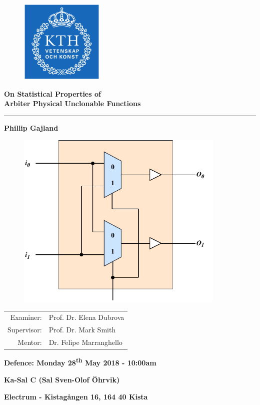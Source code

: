 \documentclass{article}
\begin{document}
\begin{figure}
    \begin{flushright}
    \includegraphics[width = 40mm]{kth_logo.png}
    \end{flushright}
\end{figure}

\vspace{10cm}

\Huge\textbf{On Statistical Properties of\\[0.25cm]
Arbiter Physical Unclonable Functions}
\\\rule{17cm}{0.5pt}

\vspace{0.5cm}

\textbf{Phillip Gajland}

\vspace{2.5cm}

\begin{figure}
    \begin{flushright}
    \includegraphics[width = 100mm]{switch_block_detailed.pdf}
    \end{flushright}
\end{figure}

\Large
\begin{tabular}{ r l }
Examiner: & Prof. Dr. Elena Dubrova\\
Supervisor: & Prof. Dr. Mark Smith\\
Mentor: & Dr. Felipe Marranghello
\end{tabular}

\vspace{2cm}

\LARGE
\textbf{Defence: Monday 28\textsuperscript{th} May 2018 - 10:00am}

\vspace{0.25cm}

\textbf{Ka-Sal C (Sal Sven-Olof Öhrvik)}

\vspace{0.25cm}

\textbf{Electrum - Kistagången 16, 164 40 Kista}

\vspace{0.5cm}

\large
\end{document}
